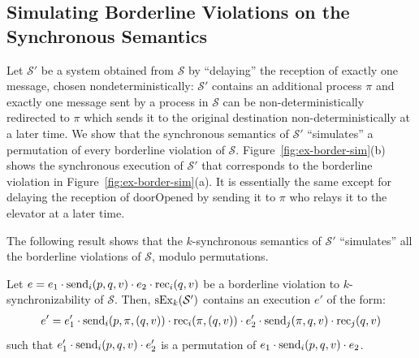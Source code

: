 \subsection{Simulating Borderline Violations on the Synchronous Semantics}\label{ssec:verif2}

Let $\mathcal{S'}$ be a system obtained from $\mathcal{S}$ by ``delaying'' the reception of exactly one message, chosen nondeterministically: $\mathcal{S'}$ contains an additional process $\pi$ and exactly one message sent by a process in $\mathcal{S}$ can be non-deterministically redirected to $\pi$ which sends it to the original destination non-deterministically at a later time.
We show that the synchronous semantics of $\mathcal{S'}$ ``simulates'' a permutation of every borderline violation of 
$\mathcal{S}$. 
Figure~\ref{fig:ex-border-sim}(b) shows the synchronous execution of $\mathcal{S'}$ that corresponds to the borderline violation in Figure~\ref{fig:ex-border-sim}(a). It is essentially the same except for delaying the reception of $\text{doorOpened}$ by sending it to $\pi$ who relays it to the elevator at a later time.


The following result shows that the $k$-synchronous semantics of $\mathcal{S'}$ ``simulates'' all the borderline violations of $\mathcal{S}$, modulo permutations. 

\begin{lemma}
Let $e=e_1\cdot \send{i}{p,q,v}\cdot e_2\cdot \rec{i}{q,v}$ be a borderline violation to $k$-synchronizability of $\mathcal{S}$. Then, $\synchExec{\mathcal{S'}}{k}$ contains an execution $e'$ of the form: 
\begin{align*}
e'=e_1'\cdot \send{i}{p,\pi,(q,v)}\cdot \rec{i}{\pi,(q,v)}\cdot e_2'\cdot \send{j}{\pi,q,v}\cdot \rec{j}{q,v}
\end{align*}
such that $e_1'\cdot \send{i}{p,q,v} \cdot e_2'$ is a permutation of $e_1\cdot \send{i}{p,q,v}\cdot e_2$.
\end{lemma}

